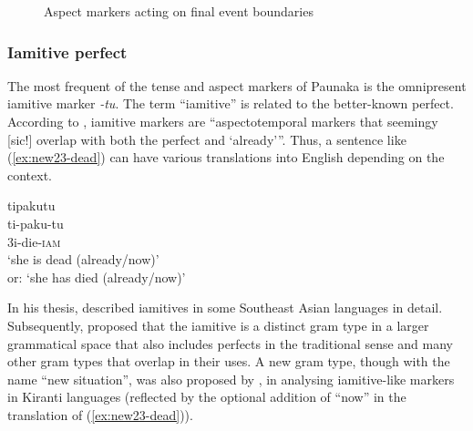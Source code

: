 \begin{figure}

\caption{Aspect markers acting on final event boundaries}
\label{fig:AspectFinalBoundaries}
\end{figure}


\subsubsection{Iamitive perfect}\label{sec:Iamitive}

The most frequent of the tense and aspect markers of Paunaka is the omnipresent iamitive marker \textit{-tu}. The term “iamitive” is related to the better-known perfect. According to \citet[4]{Olsson2013}, iamitive markers are “aspectotemporal markers that seemingy [sic!] overlap with both the perfect and ‘already’”. Thus, a sentence like (\ref{ex:new23-dead}) can have various translations into English depending on the context.

\ea\label{ex:new23-dead}
\begingl
\glpreamble tipakutu\\
\gla ti-paku-tu\\
\glb 3i-die-\textsc{iam}\\
\glft ‘she is dead (already/now)’ \\or: ‘she has died (already/now)’
\endgl
\xe

In his thesis, \citet[]{Olsson2013} described iamitives in some Southeast Asian languages in detail. Subsequently, \citet[]{DahlWalchli2016} proposed that the iamitive is a distinct gram type in a larger grammatical space that also includes perfects in the traditional sense and many other gram types that overlap in their uses. A new gram type, though with the name “new situation”, was also proposed by \citet[]{Ebert2001}, in analysing iamitive-like markers in Kiranti languages (reflected by the optional addition of “now” in the translation of (\ref{ex:new23-dead})).

